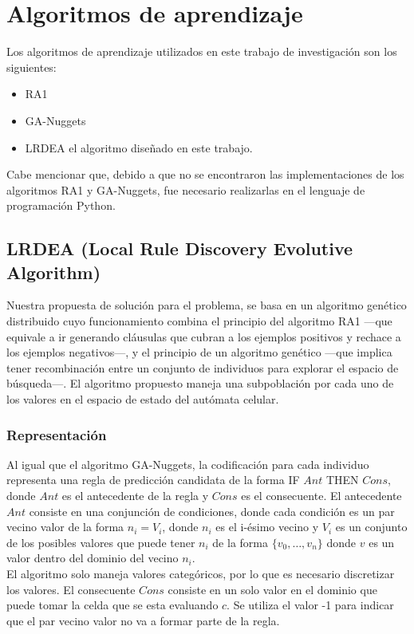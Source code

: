 \section{Algoritmos de aprendizaje}
Los algoritmos de aprendizaje utilizados en este trabajo de investigación son los siguientes:
\begin{itemize}
	\item RA1
	\item GA-Nuggets
	\item LRDEA el algoritmo diseñado en este trabajo.
\end{itemize}

Cabe mencionar que, debido a que no se encontraron las implementaciones de los algoritmos RA1 y GA-Nuggets, fue necesario realizarlas en el lenguaje de programación Python.

\subsection{LRDEA (Local Rule Discovery Evolutive Algorithm)}

Nuestra propuesta de solución para el problema, se basa en un algoritmo genético distribuido cuyo funcionamiento combina el principio del algoritmo RA1 ---que equivale a ir generando cláusulas que cubran a los ejemplos positivos y rechace a los ejemplos negativos---, y el principio de un algoritmo genético ---que implica tener recombinación entre un conjunto de individuos para explorar el espacio de búsqueda---.  El algoritmo propuesto maneja una subpoblación por cada uno de los valores en el espacio de estado del autómata celular.

\subsubsection{Representación}

Al igual que el algoritmo GA-Nuggets, la codificación para cada individuo representa una regla de predicción candidata de la forma IF $Ant$ THEN $Cons$, donde $Ant$ es el antecedente de la regla y $Cons$ es el consecuente. El antecedente $Ant$ consiste en una conjunción de condiciones, donde cada condición es un par vecino valor de la forma $n_i = V_i$, donde $n_i$ es el i-ésimo vecino y $V_{i}$ es un conjunto de los posibles valores que puede tener $n_i$ de la forma $\{v_{0},\dots,v_{n}\}$ donde $v$ es un valor dentro del dominio del vecino $n_i$.
\\
El algoritmo solo maneja valores categóricos, por lo que es necesario discretizar los valores. El consecuente $Cons$ consiste en un solo valor en el dominio que puede tomar la celda que se esta evaluando $c$. Se utiliza el valor -1 para indicar que el par vecino valor no va a formar parte de la regla.


